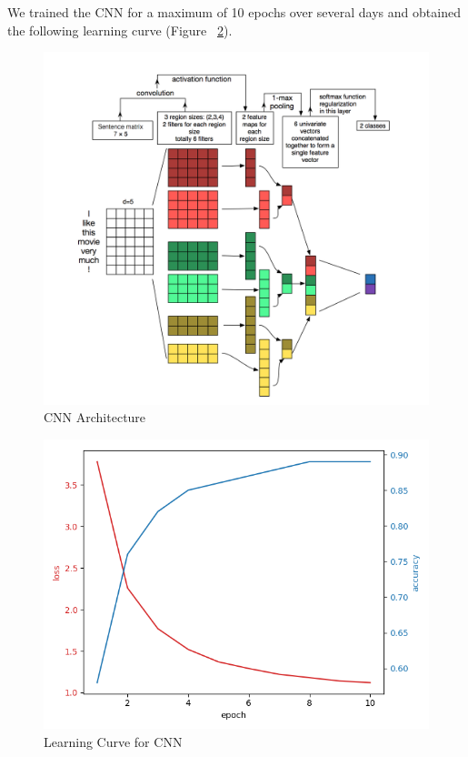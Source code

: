 \documentclass{sig-alternate-05-2015}
\begin{document}
We trained the CNN for a maximum of 10 epochs over several days and obtained the following learning curve (Figure ~\ref{fig:learningCurveCNN}).

\begin{figure}[H]
\centering
\includegraphics[width=\linewidth]{plots/multi-channel-CNN-architecture.png}
\caption{CNN Architecture}
\label{fig:architectureCNN}
\end{figure}

\begin{figure}[H]
\centering
\includegraphics[width=\linewidth]{plots/learning_curve_cnn.png}
\caption{Learning Curve for CNN}
\label{fig:learningCurveCNN}
\end{figure}
\end{document}
